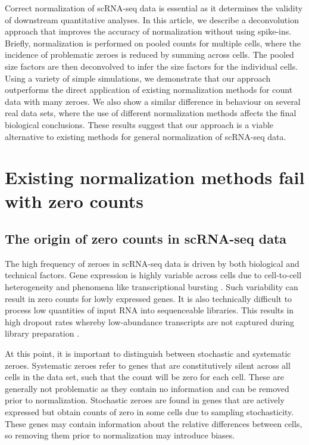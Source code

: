 \documentclass{bmcart}
\begin{document}
Correct normalization of scRNA-seq data is essential as it determines the validity of downstream quantitative analyses.
In this article, we describe a deconvolution approach that improves the accuracy of normalization without using spike-ins.
Briefly, normalization is performed on pooled counts for multiple cells, where the incidence of problematic zeroes is reduced by summing across cells.
The pooled size factors are then deconvolved to infer the size factors for the individual cells.
Using a variety of simple simulations, we demonstrate that our approach outperforms the direct application of existing normalization methods for count data with many zeroes.
We also show a similar difference in behaviour on several real data sets, where the use of different normalization methods affects the final biological conclusions.
These results suggest that our approach is a viable alternative to existing methods for general normalization of scRNA-seq data.

\section*{Existing normalization methods fail with zero counts}

\subsection*{The origin of zero counts in scRNA-seq data}
The high frequency of zeroes in scRNA-seq data is driven by both biological and technical factors.
Gene expression is highly variable across cells due to cell-to-cell heterogeneity and phenomena like transcriptional bursting \cite{marinov2014singlecell}.
Such variability can result in zero counts for lowly expressed genes.
It is also technically difficult to process low quantities of input RNA into sequenceable libraries.
This results in high dropout rates whereby low-abundance transcripts are not captured during library preparation \cite{brennecke2013accounting}.

At this point, it is important to distinguish between stochastic and systematic zeroes.
Systematic zeroes refer to genes that are constitutively silent across all cells in the data set, such that the count will be zero for each cell.
These are generally not problematic as they contain no information and can be removed prior to normalization.
Stochastic zeroes are found in genes that are actively expressed but obtain counts of zero in some cells due to sampling stochasticity.
These genes may contain information about the relative differences between cells, so removing them prior to normalization may introduce biases.
\end{document}
